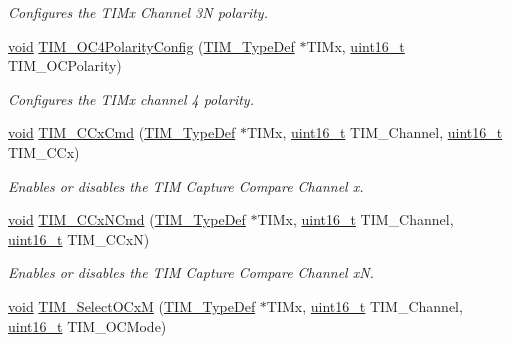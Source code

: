 \begin{DoxyCompactItemize}
\begin{DoxyCompactList}\small\item\em Configures the T\+I\+Mx Channel 3N polarity. \end{DoxyCompactList}\item 
\hyperlink{usb__devapi_8h_afabf60e7f57651d6d595a02c75f07cd0}{void} \hyperlink{group___t_i_m___exported___functions_gad678410f7c7244f83daad93ce9d1056e}{T\+I\+M\+\_\+\+O\+C4\+Polarity\+Config} (\hyperlink{struct_t_i_m___type_def}{T\+I\+M\+\_\+\+Type\+Def} $\ast$T\+I\+Mx, \hyperlink{_p_e___types_8h_a1f1825b69244eb3ad2c7165ddc99c956}{uint16\+\_\+t} T\+I\+M\+\_\+\+O\+C\+Polarity)
\begin{DoxyCompactList}\small\item\em Configures the T\+I\+Mx channel 4 polarity. \end{DoxyCompactList}\item 
\hyperlink{usb__devapi_8h_afabf60e7f57651d6d595a02c75f07cd0}{void} \hyperlink{group___t_i_m___exported___functions_ga3ecc4647d9ede261beb5e0535cf29ebb}{T\+I\+M\+\_\+\+C\+Cx\+Cmd} (\hyperlink{struct_t_i_m___type_def}{T\+I\+M\+\_\+\+Type\+Def} $\ast$T\+I\+Mx, \hyperlink{_p_e___types_8h_a1f1825b69244eb3ad2c7165ddc99c956}{uint16\+\_\+t} T\+I\+M\+\_\+\+Channel, \hyperlink{_p_e___types_8h_a1f1825b69244eb3ad2c7165ddc99c956}{uint16\+\_\+t} T\+I\+M\+\_\+\+C\+Cx)
\begin{DoxyCompactList}\small\item\em Enables or disables the T\+IM Capture Compare Channel x. \end{DoxyCompactList}\item 
\hyperlink{usb__devapi_8h_afabf60e7f57651d6d595a02c75f07cd0}{void} \hyperlink{group___t_i_m___exported___functions_ga304ff7c8a1615498da749bf2507e9f2b}{T\+I\+M\+\_\+\+C\+Cx\+N\+Cmd} (\hyperlink{struct_t_i_m___type_def}{T\+I\+M\+\_\+\+Type\+Def} $\ast$T\+I\+Mx, \hyperlink{_p_e___types_8h_a1f1825b69244eb3ad2c7165ddc99c956}{uint16\+\_\+t} T\+I\+M\+\_\+\+Channel, \hyperlink{_p_e___types_8h_a1f1825b69244eb3ad2c7165ddc99c956}{uint16\+\_\+t} T\+I\+M\+\_\+\+C\+CxN)
\begin{DoxyCompactList}\small\item\em Enables or disables the T\+IM Capture Compare Channel xN. \end{DoxyCompactList}\item 
\hyperlink{usb__devapi_8h_afabf60e7f57651d6d595a02c75f07cd0}{void} \hyperlink{group___t_i_m___exported___functions_ga83ea0af5a7c1af521236ce5e4d2c42b0}{T\+I\+M\+\_\+\+Select\+O\+CxM} (\hyperlink{struct_t_i_m___type_def}{T\+I\+M\+\_\+\+Type\+Def} $\ast$T\+I\+Mx, \hyperlink{_p_e___types_8h_a1f1825b69244eb3ad2c7165ddc99c956}{uint16\+\_\+t} T\+I\+M\+\_\+\+Channel, \hyperlink{_p_e___types_8h_a1f1825b69244eb3ad2c7165ddc99c956}{uint16\+\_\+t} T\+I\+M\+\_\+\+O\+C\+Mode)

\end{DoxyCompactItemize}

